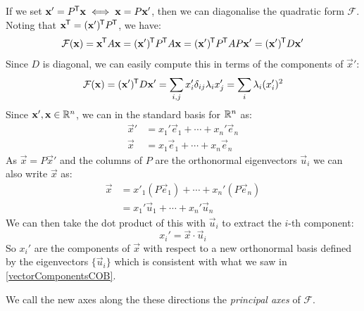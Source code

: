 \documentclass[../main.tex]{subfiles}
\begin{document}
If we set $\mathbf{\bm{x}}' = P^{{\mkern-1.5mu\mathsf{T}}} \mathbf{\bm{x}} \iff \mathbf{\bm{x}} = P\mathbf{\bm{x}}'$, then we can diagonalise the quadratic form $\mathcal{F}$.
Noting that $\mathbf{\bm{x}}^{{\mkern-1.5mu\mathsf{T}}} = (\mathbf{\bm{x}}')^{{\mkern-1.5mu\mathsf{T}}}P^{{\mkern-1.5mu\mathsf{T}}}$, we have:
\[
  \mathcal{F}(\mathbf{\bm{x}}) = \mathbf{\bm{x}}^{{\mkern-1.5mu\mathsf{T}}}A\mathbf{\bm{x}} = (\mathbf{\bm{x}}')^{{\mkern-1.5mu\mathsf{T}}} P^{{\mkern-1.5mu\mathsf{T}}} A \mathbf{\bm{x}} = (\mathbf{\bm{x}}')^{{\mkern-1.5mu\mathsf{T}}}P^{{\mkern-1.5mu\mathsf{T}}}AP\mathbf{\bm{x}}' = (\mathbf{\bm{x}}')^{{\mkern-1.5mu\mathsf{T}}}D\mathbf{\bm{x}}'
\]
Since $D$ is diagonal, we can easily compute this in terms of the components of $\vec{x}'$:
\begin{equation}
  \label{quadraticFormSum}
  \mathcal{F}(\mathbf{\bm{x}}) = (\mathbf{\bm{x}}')^{{\mkern-1.5mu\mathsf{T}}}D \mathbf{\bm{x}}' = \sum_{i, j} x_i' \delta_{i j} \lambda_i x_j'  = \sum_{i}\lambda_i (x_i')^2
\end{equation}
Since $\mathbf{\bm{x}}', \mathbf{\bm{x}} \in \mathbb{R}^{n}$, we can in the standard basis for $\mathbb{R}^{n}$ as:
\begin{align*}
  \vec{x}' &= x_1' \vec{e}_1 + \cdots + x_n' \vec{e}_n \\
  \vec{x} &= x_1 \vec{e}_1 + \cdots + x_n \vec{e}_n
\end{align*}
As $\vec{x} = P\vec{x}'$ and the columns of $P$ are the orthonormal eigenvectors $\vec{u}_i$ we can also write $\vec{x}$ as:
\begin{align*}
  \vec{x} &= x'_1(P\vec{e}_1) + \cdots + x_n'(P\vec{e}_n)\\
          &= x_1' \vec{u}_1 + \cdots + x_n'\vec{u}_n
\end{align*}
We can then take the dot product of this with $\vec{u}_i$ to extract the $i$-th component:
\[
  x_i' = \vec{x} \cdot \vec{u}_i
\]
So $x_i'$ are the components of $\vec{x}$ with respect to a new orthonormal basis defined by the eigenvectors $\{\vec{u}_i\}$ which is consistent with what we saw in \cref{vectorComponentsCOB}.

We call the new axes along the these directions the \textit{principal axes} of $\mathcal{F}$.
\end{document}
